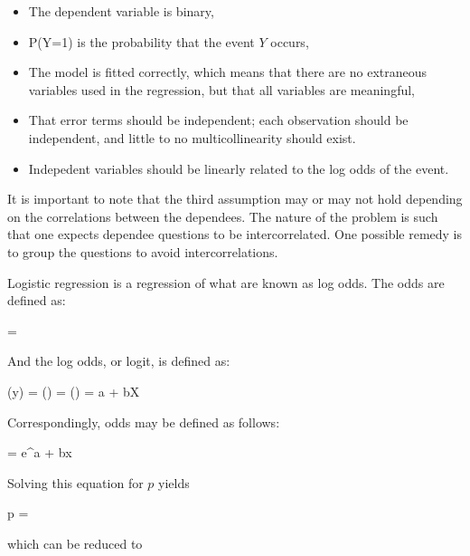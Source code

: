 \begin{itemize} 

 \item The dependent variable is binary,
 
 \item P(Y=1) is the probability that the event $Y$ occurs, 
 
 \item The model is fitted correctly, which means that there are no extraneous
 variables used in the regression, but that all variables are meaningful,

 \item That error terms should be independent; each observation should be
 independent, and little to no multicollinearity should exist.  

 \item Indepedent variables should be linearly related to the log odds of
 the event.

\end{itemize} 

It is important to note that the third assumption may or may not hold depending
on the correlations between the dependees.  The nature of the problem is such
that one expects dependee questions to be intercorrelated.  One possible remedy
is to group the questions to avoid intercorrelations.

Logistic regression is a regression of what are known as log odds. The odds
are defined as:

\begin{equations}
   = 
\end{equations}

And the log odds, or logit, is defined as:

\begin{equations}
  \logit(y) = \ln() = \ln\Big(\Big) = a + bX
\end{equations}

Correspondingly, odds may be defined as follows:

\begin{equations}
   = e^{a + bx}
\end{equations}

Solving this equation for $p$ yields

\begin{equations}
  p = 
\end{equations}

which can be reduced to 

